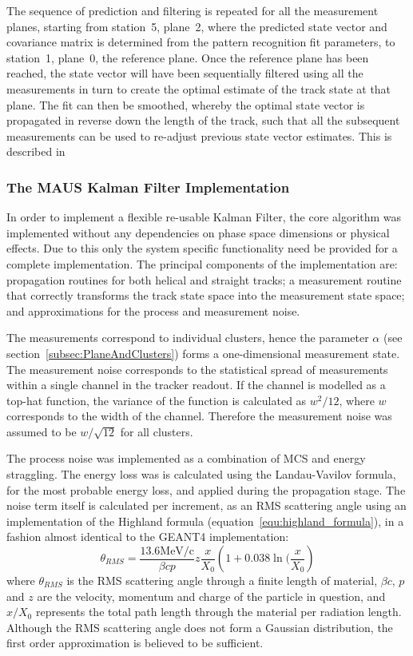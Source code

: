     The sequence of prediction and filtering is repeated for all the measurement planes, starting from station~5, plane~2, where the predicted state vector and covariance matrix is determined from the pattern recognition fit parameters, to station~1, plane~0, the reference plane. Once the reference plane has been reached, the state vector will have been sequentially filtered using all the measurements in turn to create the optimal estimate of the track state at that plane. The fit can then be smoothed, whereby the optimal state vector is propagated in reverse down the length of the track, such that all the subsequent measurements can be used to re-adjust previous state vector estimates. This is described in~\cite{Fruhwirth}


    \subsubsection{The MAUS Kalman Filter Implementation}
    In order to implement a flexible re-usable Kalman Filter, the core algorithm was implemented without any dependencies on phase space dimensions or physical effects. Due to this only the system specific functionality need be provided for a complete implementation.
    The principal components of the implementation are: propagation routines for both helical and straight tracks; a measurement routine that correctly transforms the track state space into the measurement state space; and approximations for the process and measurement noise.
    
    The measurements correspond to individual clusters, hence the parameter $\alpha$ (see section~\ref{subsec:PlaneAndClusters}) forms a one-dimensional measurement state. The measurement noise corresponds to the statistical spread of measurements within a single channel in the tracker readout. If the channel is modelled as a top-hat function, the variance of the function is calculated as $w^2/12$, where $w$ corresponds to the width of the channel. Therefore the measurement noise was assumed to be $w/\sqrt{12}$ for all clusters.

    The process noise was implemented as a combination of MCS and energy straggling. The energy loss  was is calculated using the Landau-Vavilov formula, for the most probable energy loss, and applied during the propagation stage. The noise term itself is calculated per increment, as an RMS scattering angle using an implementation of the Highland formula (equation~\ref{equ:highland_formula}), in a fashion almost identical to the GEANT4 implementation:
    \begin{equation}
      \theta_{RMS} = \frac{13.6\textrm{MeV/c}}{\beta c p} z \frac{x}{X_0}\left( 1 + 0.038 \ln(\frac{x}{X_0} \right)
      \label{equ:highland_formula}
    \end{equation}
    where $\theta_{RMS}$ is the RMS scattering angle through a finite length of material, $\beta c$, $p$ and $z$ are the velocity, momentum and charge of the particle in question, and $x/X_0$ represents the total path length through the material per radiation length. Although the RMS scattering angle does not form a Gaussian distribution, the first order approximation is believed to be sufficient.

